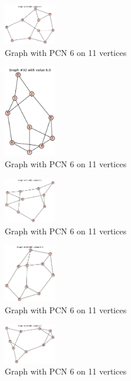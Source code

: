 \documentclass[12pt,a4paper]{amsart}
\theoremstyle{definition}
\theoremstyle{plain}
\begin{document}
\begin{figure}[h]
    \centering
    \includegraphics[width=0.2\textwidth]{Images/11}
    \caption{Graph with PCN 6 on 11 vertices}
\end{figure}
\begin{figure}[h]
    \centering
    \includegraphics[width=0.2\textwidth]{Images/12}
    \caption{Graph with PCN 6 on 11 vertices}
\end{figure}
\begin{figure}[h]
    \centering
    \includegraphics[width=0.2\textwidth]{Images/13}
    \caption{Graph with PCN 6 on 11 vertices}
\end{figure}
\begin{figure}[h]
    \centering
    \includegraphics[width=0.2\textwidth]{Images/14}
    \caption{Graph with PCN 6 on 11 vertices}
\end{figure}
\begin{figure}[h]
    \centering
    \includegraphics[width=0.2\textwidth]{Images/15}
    \caption{Graph with PCN 6 on 11 vertices}
    \end{figure}
\end{document}

